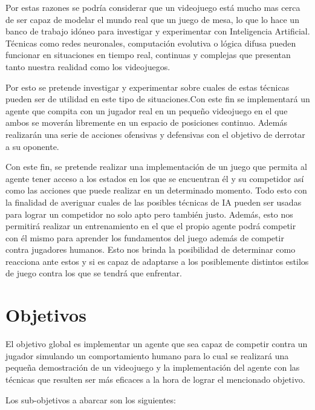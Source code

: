 \bigskip

Por estas razones se podría considerar que un videojuego está mucho mas cerca de ser capaz de modelar el mundo real que un juego de mesa, lo que lo hace un banco de trabajo idóneo para investigar y experimentar con Inteligencia Artificial. Técnicas como redes neuronales, computación evolutiva o lógica difusa pueden funcionar en situaciones en tiempo real, continuas y complejas que presentan tanto nuestra realidad como los videojuegos.

\bigskip

Por esto se pretende investigar y experimentar sobre cuales de estas técnicas pueden ser de utilidad en este tipo de situaciones.Con este fin se implementará un agente que compita con un jugador real en un pequeño videojuego en el que ambos se moverán libremente en un espacio de posiciones continuo. Además realizarán una serie de acciones ofensivas y defensivas con el objetivo de derrotar a su oponente.

\bigskip

Con este fin, se pretende realizar una implementación de un juego que permita al agente tener acceso a los estados en los que se encuentran él y su competidor así como las acciones que puede realizar en un determinado momento. Todo esto con la finalidad de averiguar cuales de las posibles técnicas de IA pueden ser usadas para lograr un competidor no solo apto pero también justo. Además, esto nos permitirá realizar un entrenamiento en el que el propio agente podrá competir con él mismo para aprender los fundamentos del juego además de competir contra jugadores humanos. Esto nos brinda la posibilidad de determinar como reacciona ante estos y si es capaz de adaptarse a los posiblemente distintos estilos de juego contra los que se tendrá que enfrentar.

\section{Objetivos}

El objetivo global es implementar un agente que sea capaz de competir contra un jugador simulando un comportamiento humano para lo cual se realizará una pequeña demostración de un videojuego y la implementación del agente con las técnicas que resulten ser más eficaces a la hora de lograr el mencionado objetivo.

\bigskip

Los sub-objetivos a abarcar son los siguientes:

